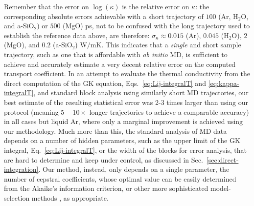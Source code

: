 Remember that the error on $\log(\kappa)$ is the relative error on $\kappa$: the corresponding absolute errors achievable with a short trajectory of $100$ (Ar, H$_2$O, and a-SiO$_2$) or $500$ (MgO) ps, not to be confused with the long trajectory used to establish the reference data above, are therefore: $\sigma_\kappa \approx 0.015$ (Ar), $0.045$ (H$_2$O), $2$ (MgO), and $0.2$ (a-SiO$_2$) $\mathrm{W/mK}$. This indicates that a \emph{single} and short sample trajectory, such as one that is affordable with \emph{ab initio} MD, is sufficient to achieve and accurately estimate a very decent relative error on the computed transport coefficient. In an attempt to evaluate the thermal conductivity from the direct computation of the GK equation, Eqs.~\eqref{eq:Lij-integralT} and \eqref{eq:kappa-integralT}, and standard block analysis using similarly short MD trajectories, our best estimate of the resulting statistical error was 2-3 times larger than using our protocol (meaning $5-10\times$ longer trajectories to achieve a comparable accuracy) in all cases but liquid Ar, where only a marginal improvement is achieved using our methodology. Much more than this, the standard analysis of MD data depends on a number of hidden parameters, such as the upper limit of the GK integral, Eq.~\eqref{eq:Lij-integralT}, or the width of the blocks for error analysis, that are hard to determine and keep under control, as discussed in Sec.~\ref{sec:direct-integration}. Our method, instead, only depends on a single parameter, the number of cepstral coefficients, whose optimal value can be easily determined from the Akaike's information criterion, or other more sophisticated model-selection methods \cite{Burnham2004,Claeskens2008}, as appropriate.


